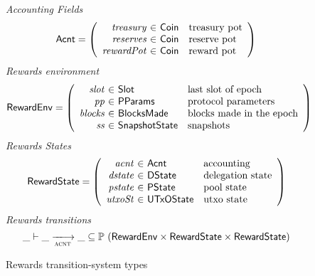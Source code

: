 \begin{figure}[htb]
  \emph{Accounting Fields}
  \begin{equation*}
    \Acnt =
    \left(
      \begin{array}{r@{~\in~}ll}
        \var{treasury} & \Coin & \text{treasury pot}\\
        \var{reserves} & \Coin & \text{reserve pot}\\
        \var{rewardPot} & \Coin & \text{reward pot}\\
      \end{array}
    \right)
  \end{equation*}
  \emph{Rewards environment}
  \begin{equation*}
    \RewardEnv =
    \left(
      \begin{array}{r@{~\in~}ll}
        \var{slot} & \Slot & \text{last slot of epoch}\\
        \var{pp} & \PParams & \text{protocol parameters}\\
        \var{blocks} & \BlocksMade & \text{blocks made in the epoch}\\
        \var{ss} & \SnapshotState & \text{snapshots}\\
      \end{array}
    \right)
  \end{equation*}
  \emph{Rewards States}
  \begin{equation*}
    \RewardState =
    \left(
      \begin{array}{r@{~\in~}ll}
        \var{acnt} & \Acnt & \text{accounting}\\
        \var{dstate} & \DState & \text{delegation state}\\
        \var{pstate} & \PState & \text{pool state}\\
        \var{utxoSt} & \UTxOState & \text{utxo state}\\
      \end{array}
    \right)
  \end{equation*}
  \emph{Rewards transitions}
  \begin{equation*}
    \_ \vdash
    \var{\_} \trans{acnt}{} \var{\_}
    \subseteq \powerset (\RewardEnv \times \RewardState \times \RewardState)
  \end{equation*}
  \caption{Rewards transition-system types}
  \label{fig:ts-types:reward}
\end{figure}

\clearpage

